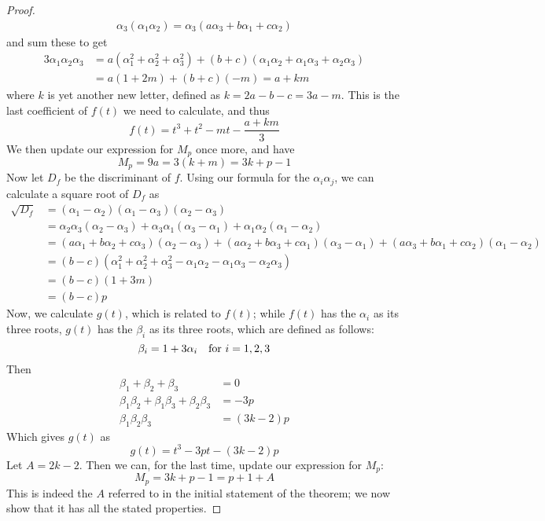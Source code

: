 \begin{proof}
\begin{align*}
	\alpha_3 (\alpha_1 \alpha_2) = \alpha_3 (a\alpha_3 + b\alpha_1 + c\alpha_2)
\end{align*}
and sum these to get
\begin{align*}
	3\alpha_1 \alpha_2 \alpha_3 &= a(\alpha_1^2 + \alpha_2^2 + \alpha_3^2) + (b+c)(\alpha_1\alpha_2 +\alpha_1\alpha_3 +\alpha_2\alpha_3)\\
	&= a(1+2m) +(b+c)(-m) = a + km
\end{align*}
where $k$ is yet another new letter, defined as $k = 2a-b-c=3a-m$.
This is the last coefficient of $f(t)$ we need to calculate, and thus
$$f(t) = t^3 + t^2 - mt - \frac{a+km}{3}$$
We then update our expression for $M_p$ once more, and have
$$M_p = 9a = 3(k + m) = 3k + p - 1$$
Now let $D_f$ be the discriminant of $f$.
Using our formula for the $\alpha_i \alpha_j$, we can calculate a square root of $D_f$ as
\begin{align*}
	\sqrt{D_f} &= (\alpha_1 - \alpha_2)(\alpha_1 - \alpha_3)(\alpha_2 - \alpha_3)\\
	&= \alpha_2\alpha_3(\alpha_2-\alpha_3) + \alpha_3\alpha_1(\alpha_3-\alpha_1) + \alpha_1\alpha_2(\alpha_1-\alpha_2)\\
	&= (a\alpha_1 + b\alpha_2 + c\alpha_3)(\alpha_2 - \alpha_3) + (a\alpha_2 + b\alpha_3 + c\alpha_1)(\alpha_3 - \alpha_1) + (a\alpha_3 + b\alpha_1 + c\alpha_2)(\alpha_1 - \alpha_2)\\
	&= (b-c)(\alpha_1^2 + \alpha_2^2 + \alpha_3^2 - \alpha_1\alpha_2 - \alpha_1\alpha_3 - \alpha_2\alpha_3)\\
	&= (b-c)(1 + 3m)\\
	&= (b-c)p
\end{align*}
Now, we calculate $g(t)$, which is related to $f(t)$; while $f(t)$ has the $\alpha_i$ as its three roots, $g(t)$ has the $\beta_i$ as its three roots, which are defined as follows:
$$\beta_i = 1 + 3\alpha_i\quad \text{for } i=1,2,3$$
Then
\begin{align*}
	\beta_1 + \beta_2 + \beta_3 &= 0\\
	\beta_1\beta_2 + \beta_1\beta_3 + \beta_2\beta_3 &= -3p\\
	\beta_1\beta_2\beta_3 &= (3k-2)p
\end{align*}
Which gives $g(t)$ as
$$g(t) = t^3 - 3pt - (3k-2)p$$
Let $A = 2k - 2$.
Then we can, for the last time, update our expression for $M_p$:
$$M_p = 3k + p - 1 = p + 1 + A$$
This is indeed the $A$ referred to in the initial statement of the theorem; we now show that it has all the stated properties.


\end{proof}
